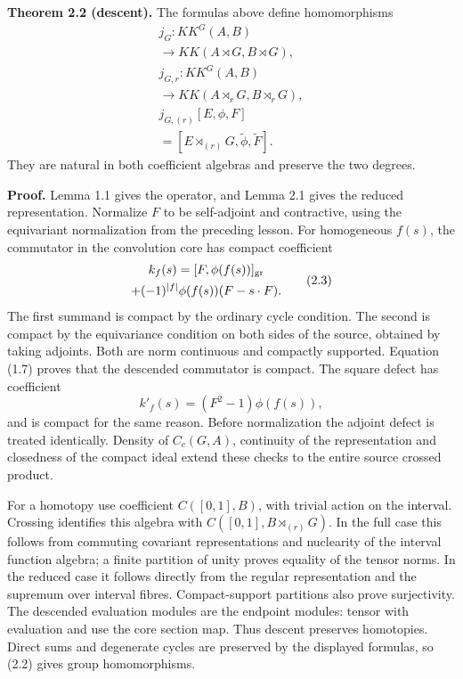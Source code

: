 \documentclass[
  11pt,
]{article}
\begin{document}
\textbf{Theorem 2.2 (descent).} The formulas above define homomorphisms
\[
\begin{gathered}
j_G:KK^G(A,B)\\
\longrightarrow KK(A\rtimes G,B\rtimes G),\\
j_{G,r}:KK^G(A,B)\\
\longrightarrow KK(A\rtimes_rG,B\rtimes_rG),\\
j_{G,(r)}[E,\phi,F]\\
=[E\rtimes_{(r)}G,\widetilde\phi,\widetilde F].
\end{gathered}
\tag{2.2}
\] They are natural in both coefficient algebras and preserve the two
degrees.

\textbf{Proof.} Lemma 1.1 gives the operator, and Lemma 2.1 gives the
reduced representation. Normalize \(F\) to be self-adjoint and
contractive, using the equivariant normalization from the preceding
lesson. For homogeneous \(f(s)\), the commutator in the convolution core
has compact coefficient \[
\begin{gathered}
k_f(s)=[F,\phi(f(s))]_{\rm gr}\\
 +(-1)^{|f|}\phi(f(s))(F-s\cdot F).
\end{gathered}
\tag{2.3}
\] The first summand is compact by the ordinary cycle condition. The
second is compact by the equivariance condition on both sides of the
source, obtained by taking adjoints. Both are norm continuous and
compactly supported. Equation (1.7) proves that the descended commutator
is compact. The square defect has coefficient \[
k'_f(s)=(F^2-1)\phi(f(s)),
\tag{2.4}
\] and is compact for the same reason. Before normalization the adjoint
defect is treated identically. Density of \(C_c(G,A)\), continuity of
the representation and closedness of the compact ideal extend these
checks to the entire source crossed product.

For a homotopy use coefficient \(C([0,1],B)\), with trivial action on
the interval. Crossing identifies this algebra with
\(C([0,1],B\rtimes_{(r)}G)\). In the full case this follows from
commuting covariant representations and nuclearity of the interval
function algebra; a finite partition of unity proves equality of the
tensor norms. In the reduced case it follows directly from the regular
representation and the supremum over interval fibres. Compact-support
partitions also prove surjectivity. The descended evaluation modules are
the endpoint modules: tensor with evaluation and use the core section
map. Thus descent preserves homotopies. Direct sums and degenerate
cycles are preserved by the displayed formulas, so (2.2) gives group
homomorphisms.
\end{document}
